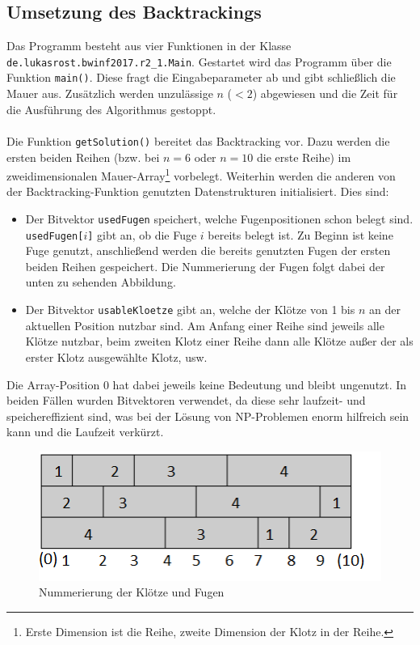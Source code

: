 \documentclass[a4paper, notitlepage, 12pt]{scrartcl}
\begin{document}
\subsection{Umsetzung des Backtrackings}
Das Programm besteht aus vier Funktionen in der Klasse \texttt{de.lukasrost.bwinf2017.r2\_1.Main}. Gestartet wird das Programm über die Funktion \texttt{main()}. Diese fragt die Eingabeparameter ab und gibt schließlich die Mauer aus. Zusätzlich werden unzulässige $n$ ($< 2$) abgewiesen und die Zeit für die Ausführung des Algorithmus gestoppt. \\ \\
Die Funktion \texttt{getSolution()} bereitet das Backtracking vor. Dazu werden die ersten beiden Reihen (bzw. bei $n = 6$ oder $n = 10$ die erste Reihe) im zweidimensionalen Mauer-Array\footnote{Erste Dimension ist die Reihe, zweite Dimension der Klotz in der Reihe.} vorbelegt. Weiterhin werden die anderen von der Backtracking-Funktion genutzten Datenstrukturen initialisiert. Dies sind: 
\begin{itemize}
\item Der Bitvektor \texttt{usedFugen} speichert, welche Fugenpositionen schon belegt sind. \texttt{usedFugen[$i$]} gibt an, ob die Fuge $i$ bereits belegt ist. Zu Beginn ist keine Fuge genutzt, anschließend werden die bereits genutzten Fugen der ersten beiden Reihen gespeichert. Die Nummerierung der Fugen folgt dabei der unten zu sehenden Abbildung.
\item Der Bitvektor \texttt{usableKloetze} gibt an, welche der Klötze von 1 bis $n$ an der aktuellen Position nutzbar sind. Am Anfang einer Reihe sind jeweils alle Klötze nutzbar, beim zweiten Klotz einer Reihe dann alle Klötze außer der als erster Klotz ausgewählte Klotz, usw.
\end{itemize}
Die Array-Position $0$ hat dabei jeweils keine Bedeutung und bleibt ungenutzt. In beiden Fällen wurden Bitvektoren verwendet, da diese sehr laufzeit- und speichereffizient sind, was bei der Lösung von NP-Problemen enorm hilfreich sein kann und die Laufzeit verkürzt. \\
\begin{figure}[H]
\begin{center}
\includegraphics[scale=1.0]{pics/mauerBenennung.png}
\caption{Nummerierung der Klötze und Fugen}
\end{center}
\end{figure}
\end{document}
